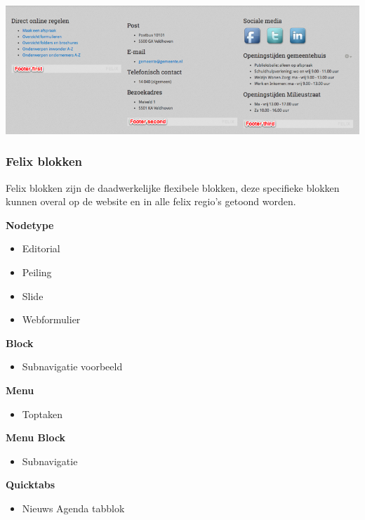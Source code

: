 \begin{center}
	\includegraphics[width=\textwidth]{img/felix2.png}
\end{center}

\subsubsection{Felix blokken}\label{felixblokken}

Felix blokken zijn de daadwerkelijke flexibele blokken, deze specifieke blokken kunnen overal op de website en in alle felix regio's getoond worden.

\textbf{Nodetype}

\begin{itemize}
\item Editorial
\item Peiling
\item Slide 
\item Webformulier
\end{itemize}

\textbf{Block}

\begin{itemize}
\item Subnavigatie voorbeeld
\end{itemize}

\textbf{Menu}

\begin{itemize}
\item Toptaken
\end{itemize}

\textbf{Menu Block}

\begin{itemize}
\item Subnavigatie
\end{itemize}

\textbf{Quicktabs}

\begin{itemize}
\item Nieuws Agenda tabblok
\end{itemize}


